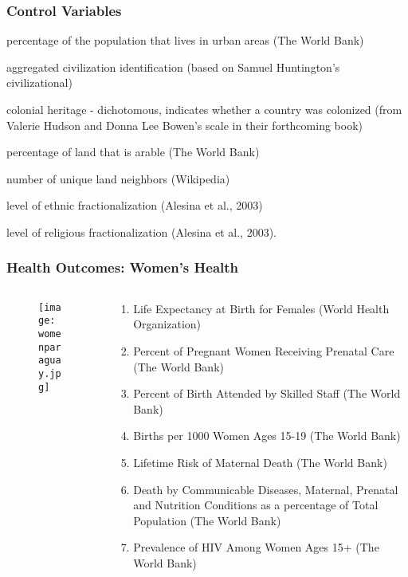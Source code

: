 \documentclass{beamer}
\begin{document}
\begin{frame}
\frametitle{Control Variables}
\itemize
\item percentage of the population that lives in urban areas (The World Bank)
\item aggregated civilization identification (based on Samuel Huntington's civilizational) \item colonial heritage - dichotomous, indicates whether a country was colonized (from Valerie Hudson and Donna Lee Bowen's scale in their forthcoming book)
\item percentage of land that is arable (The World Bank)
\item number of unique land neighbors (Wikipedia)
\item level of ethnic fractionalization (Alesina et al., 2003)
\item level of religious fractionalization (Alesina et al., 2003).
\end{frame}

\begin{frame}
\frametitle{Health Outcomes: Women's Health}
\begin{columns}
	\begin{column}{0.38\textwidth}
	\centering
		\vspace{-1.5em}
		\begin{figure}
\texttt{[image: womenparaguay.jpg]}
\end{figure}
	\end{column}
	\begin{column}{0.58\textwidth}
	\scriptsize
\begin{enumerate}
\item Life Expectancy at Birth for Females (World Health Organization)
\item Percent of Pregnant Women Receiving Prenatal Care (The World Bank)
\item Percent of Birth Attended by Skilled Staff (The World Bank)
\item Births per 1000 Women Ages 15-19 (The World Bank)
\item Lifetime Risk of Maternal Death (The World Bank)
\item Death by Communicable Diseases, Maternal, Prenatal and Nutrition Conditions as a percentage of Total Population (The World Bank)
\item Prevalence of HIV Among Women Ages 15+ (The World Bank)
\end{enumerate}
	\end{column}
\end{columns}
\end{frame}
\end{document}
